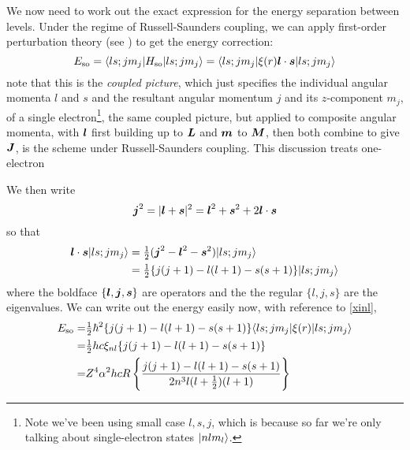 \begin{center}

\end{center}
We now need to work out the exact expression for the energy separation between levels. Under the regime of Russell-Saunders coupling, we can apply first-order perturbation theory (see ) to get the energy correction:
\begin{equation}
	E_{\mathrm{so}}=\langle ls;jm_j|H_{\mathrm{so}} |ls;jm_j \rangle=\langle ls;jm_j|\xi(r)\boldsymbol{l}\cdot\boldsymbol{s} |ls;jm_j \rangle
\end{equation}
note that this is the \emph{coupled picture}, which just specifies the individual angular momenta $l$ and $s$ and the resultant angular momentum $j$ and its $z$-component $m_j$, of a single electron\footnote{Note we've been using small case $l,s,j$, which is because so far we're only talking about single-electron states $|nlm_l\rangle$.}, the same coupled picture, but applied to composite angular momenta, with $\boldsymbol{l}$ first building up to $\boldsymbol{L}$ and $\boldsymbol{m}$ to $\boldsymbol{M}$, then both combine to give $\boldsymbol{J}$, is the scheme under Russell-Saunders coupling. This discussion treats one-electron\par
We then write
\begin{equation}
	\boldsymbol{j}^2=|\boldsymbol{l}+\boldsymbol{s}|^2=\boldsymbol{l}^2+\boldsymbol{s}^2+2\boldsymbol{l}\cdot\boldsymbol{s}
\end{equation}
so that
\begin{equation}
\begin{aligned}
\boldsymbol{l}\cdot\boldsymbol{s} |ls;jm_j \rangle&=\tfrac{1}{2}(\boldsymbol{j}^2-\boldsymbol{l}^2-\boldsymbol{s}^2)|ls;jm_j \rangle\\
&=\tfrac{1}{2}\{j(j+1)-l(l+1)-s(s+1) \}|ls;jm_j \rangle
\end{aligned}
\end{equation}
where the boldface $\{\boldsymbol{l},\boldsymbol{j},\boldsymbol{s}\}$ are operators and the the regular $\{l,j,s\}$ are the eigenvalues. We can write out the energy easily now, with reference to \cref{xinl},
\begin{equation}
\label{esoc}
\begin{aligned}
E_{\mathrm{so}}=&\tfrac{1}{2}\hbar^2\{j(j+1)-l(l+1)-s(s+1) \}\langle ls;jm_j|\xi(r) |ls;jm_j  \rangle\\
=&\tfrac{1}{2}hc\xi_{nl}\{j(j+1)-l(l+1)-s(s+1) \}\\
=&Z^4\alpha^2hcR\left\{\frac{j(j+1)-l(l+1)-s(s+1)}{2n^3l(l+\tfrac{1}{2})(l+1)} \right\}
\end{aligned}
\end{equation}
